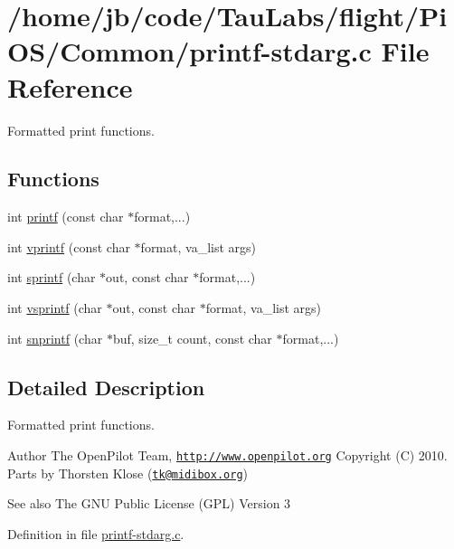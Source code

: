 \hypertarget{printf-stdarg_8c}{\section{/home/jb/code/\-Tau\-Labs/flight/\-Pi\-O\-S/\-Common/printf-\/stdarg.c \-File \-Reference}
\label{printf-stdarg_8c}
}


\-Formatted print functions.  


\subsection*{\-Functions}
\begin{DoxyCompactItemize}
\item 
int \hyperlink{group___p_i_o_s_ga98631211a4a8aee62f572375d5b637be}{printf} (const char $\ast$format,...)
\item 
int \hyperlink{group___p_i_o_s_gaae4ab8b56862ed0a04505cafb8a05112}{vprintf} (const char $\ast$format, va\-\_\-list args)
\item 
int \hyperlink{group___p_i_o_s_gaa0649118bc3728b2a62af0b47606ff51}{sprintf} (char $\ast$out, const char $\ast$format,...)
\item 
int \hyperlink{group___p_i_o_s_ga7408e892dd48c6ce39b5821d917a3dd2}{vsprintf} (char $\ast$out, const char $\ast$format, va\-\_\-list args)
\item 
int \hyperlink{group___p_i_o_s_gaf78a52a59a43dc156963dbbab958a468}{snprintf} (char $\ast$buf, size\-\_\-t count, const char $\ast$format,...)
\end{DoxyCompactItemize}


\subsection{\-Detailed \-Description}
\-Formatted print functions. \begin{DoxyAuthor}{\-Author}
\-The \-Open\-Pilot \-Team, \href{http://www.openpilot.org}{\tt http\-://www.\-openpilot.\-org} \-Copyright (\-C) 2010. \-Parts by \-Thorsten \-Klose (\href{mailto:tk@midibox.org}{\tt tk@midibox.\-org}) 
\end{DoxyAuthor}
\begin{DoxySeeAlso}{\-See also}
\-The \-G\-N\-U \-Public \-License (\-G\-P\-L) \-Version 3 
\end{DoxySeeAlso}


\-Definition in file \hyperlink{printf-stdarg_8c_source}{printf-\/stdarg.\-c}.


